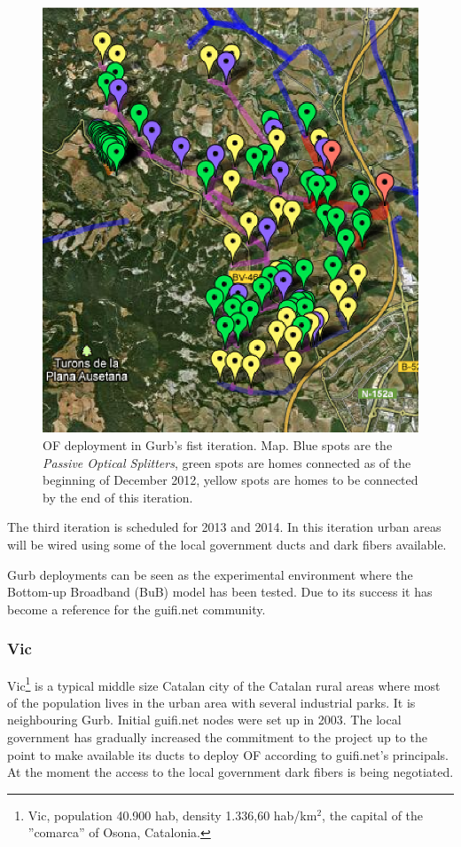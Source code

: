 \begin{figure}[htbp]
  \centering
  \includegraphics[scale=1.3]{deployments/figures/Gurb_it2_map.eps} 
  \caption{OF deployment in Gurb's fist iteration. Map. Blue spots are the \emph{Passive Optical Splitters}, green spots are homes connected as of the beginning of December 2012, yellow spots are homes to be connected by the end of this iteration.}
  \label{fig:gurb_it2_map}
\end{figure}

The third iteration is scheduled for 2013 and 2014. In this iteration urban areas will be wired using some of the local government ducts and dark fibers available.

Gurb deployments can be seen as the experimental environment where the Bottom-up Broadband (BuB) model has been tested. Due to its success it has become a reference for the guifi.net community.

\FloatBarrier
\subsubsection{Vic}

Vic\footnote{Vic, population 40.900 hab, density 1.336,60 hab/km$^{2}$, the capital of the ''comarca'' of Osona, Catalonia.} is a typical middle size Catalan city of the Catalan rural areas where most of the population lives in the urban area with several industrial parks. It is neighbouring Gurb. Initial guifi.net nodes were set up in 2003. The local government has gradually increased the commitment to the project up to the point to make available its ducts to deploy OF according to guifi.net's principals. At the moment the access to the local government dark fibers is being negotiated.


